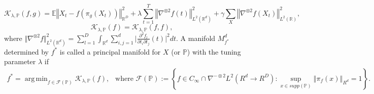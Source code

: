 \documentclass[11pt,reqno]{article}
\DeclareMathOperator*{\argmin}{arg\,min}
\begin{document}
	\begin{equation}\label{PMSEF}
	\mathcal{K}_{\lambda,\mathbb{P}}(f,g)=\mathbb{E}\left\Vert X_t - f\left(\pi_g(X_t)\right)\right\Vert^2_{\mathbb{R}^D} + \lambda \sum_{t = 1}^T \left\Vert\nabla^{\otimes 2} f(t)\right\Vert_{L^2(\mathbb{R}^d)}^2 + \gamma \sum_{X} \left\Vert\nabla^{\otimes 2} f(X_t)\right\Vert_{L^2(\mathbb{R})}^2, 
	\end{equation}
	\begin{equation}%
	\mathcal{K}_{\lambda,\mathbb{P}}(f)=\mathcal{K}_{\lambda,\mathbb{P}}(f,f),
	\end{equation}
	where $\Vert\nabla^{\otimes 2}f \Vert_{L^2(\mathbb{R}^d)}^2 = \sum_{l=1}^D\int_{\mathbb{R}^d} \sum_{i,j=1}^d\vert\frac{\partial^2 f_l}{\partial t_i \partial t_j}(t)\vert^2dt$. A manifold $M_{f^*}^d$ determined by $f^*$ is called a principal manifold for $X$ (or $\mathbb{P}$) with the tuning parameter $\lambda$ if 
	\begin{align}\label{def: PM}
	f^*=\argmin_{f\in\mathscr{F}(\mathbb{P})}\mathcal{K}_{\lambda,\mathbb{P}}(f),\ \ \mbox{ where }\mathscr{F}(\mathbb{P}):=\left\{f\in C_\infty\cap \nabla^{-\otimes 2}L^2( R^d \rightarrow R^D):\sup_{x\in supp(\mathbb{P})}\left\Vert\pi_f(x)\right\Vert_{R^d} = 1 \right\}.
	\end{align}

\LinesNumbered
\end{document}

